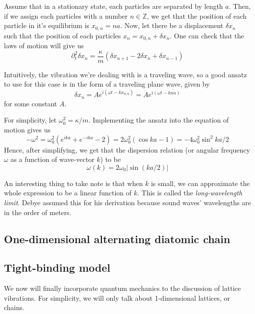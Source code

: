 \documentclass[12pt]{article}
\begin{document}
\vspace{0.25in}

Assume that in a stationary state, each particles are separated by length $a$. Then, if we assign each particles with a number $n\in\mathbb{Z}$, we get that the position of each particle in it's equilibrium is $x_{0,n}=na$. Now, let there be a displacement $\delta x_n$ such that the position of each particles $x_n=x_{0,n}+\delta x_n$. One can check that the laws of motion will give us
\begin{equation*}
    \partial^2_t\delta x_n=\frac{\kappa}{m}(\delta x_{n+1}-2\delta x_n+\delta x_{n-1})
\end{equation*}

Intuitively, the vibration we're dealing with is a traveling wave, so a good ansatz to use for this case is in the form of a traveling plane wave, given by
\begin{equation*}
    \delta x_n=Ae^{i(\omega t-kx_{0,n})}=Ae^{i(\omega t-kna)}
\end{equation*}
for some constant $A$.

\vspace{0.25in}

For simplicity, let $\omega_0^2=\kappa/m$. Implementing the ansatz into the equation of motion gives us
\begin{equation*}
    -\omega^2=\omega_0^2(e^{ika}+e^{-ika}-2)=2\omega_0^2(\cos{ka}-1)=-4\omega_0^2\sin^2{ka/2}
\end{equation*}
Hence, after simplifying, we get that the dispersion relation (or angular frequency $\omega$ as a function of wave-vector $k$) to be
\begin{equation*}
    \omega(k)=2\omega_0|\sin{(ka/2)} |
\end{equation*}

An interesting thing to take note is that when $k$ is small, we can approximate the whole expression to be a linear function of $k$. This is called the \textit{long-wavelength limit}. Debye assumed this for his derivation because sound waves' wavelengths are in the order of meters. 

\subsection{One-dimensional alternating diatomic chain}

\subsection{Tight-binding model}
We now will finally incorporate quantum mechanics to the discussion of lattice vibrations. For simplicity, we will only talk about 1-dimensional lattices, or chains.
\end{document}
